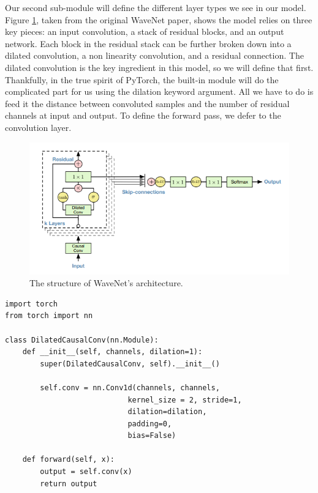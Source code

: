 Our second sub-module will define the different layer types we see in our model. Figure \ref{fig:dccnlayer}, taken from the original WaveNet paper, shows the model relies on three key pieces: an input convolution, a stack of residual blocks, and an output network. Each block in the residual stack can be further broken down into a dilated convolution, a non linearity convolution, and a residual connection. The dilated convolution is the key ingredient in this model, so we will define that first. Thankfully, in the true spirit of PyTorch, the built-in module will do the complicated part for us using the dilation keyword argument. All we have to do is feed it the distance between convoluted samples and the number of residual channels at input and output. To define the forward pass, we defer to the convolution layer.

\newpage

\begin{figure}[h]
    \centering
    \includegraphics[width=5.5in]{images/DCCN_Layer.png}
    \caption{The structure of WaveNet's architecture.}
    \label{fig:dccnlayer}
\end{figure}

\begin{verbatim}
import torch
from torch import nn

class DilatedCausalConv(nn.Module):
    def __init__(self, channels, dilation=1):
        super(DilatedCausalConv, self).__init__()

        self.conv = nn.Conv1d(channels, channels,
                            kernel_size = 2, stride=1,
                            dilation=dilation,
                            padding=0,
                            bias=False)

    def forward(self, x):
        output = self.conv(x)
        return output
\end{verbatim}

